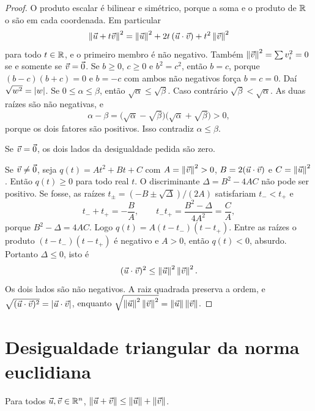 \documentclass[11pt,a4paper]{article}
\begin{document}
\begin{proof}
O produto escalar é bilinear e simétrico, porque a soma e o produto de $\mathbb{R}$ o são em cada coordenada. Em particular
\[
\left\lVert \vec{u}+t\vec{v} \right\rVert^2
=\left\lVert \vec{u} \right\rVert^2+2t\,(\vec{u}\cdot\vec{v})+t^2\left\lVert \vec{v} \right\rVert^2
\]
para todo $t\in\mathbb{R}$, e o primeiro membro é não negativo. Também $\left\lVert \vec{v} \right\rVert^2=\sum v_i^2=0$ se e somente se $\vec{v}=\vec{0}$. Se $b\ge 0$, $c\ge 0$ e $b^2=c^2$, então $b=c$, porque $(b-c)(b+c)=0$ e $b=-c$ com ambos não negativos força $b=c=0$. Daí $\sqrt{w^2}=\left\lvert w \right\rvert$. Se $0\le\alpha\le\beta$, então $\sqrt{\alpha}\le\sqrt{\beta}$. Caso contrário $\sqrt{\beta}<\sqrt{\alpha}$. As duas raízes são não negativas, e
\[
\alpha-\beta
=\bigl(\sqrt{\alpha}-\sqrt{\beta}\bigr)\bigl(\sqrt{\alpha}+\sqrt{\beta}\bigr)>0,
\]
porque os dois fatores são positivos. Isso contradiz $\alpha\le\beta$.

Se $\vec{v}=\vec{0}$, os dois lados da desigualdade pedida são zero.

Se $\vec{v}\neq\vec{0}$, seja $q(t)=At^2+Bt+C$ com $A=\left\lVert \vec{v} \right\rVert^2>0$, $B=2(\vec{u}\cdot\vec{v})$ e $C=\left\lVert \vec{u} \right\rVert^2$. Então $q(t)\ge 0$ para todo real $t$. O discriminante $\Delta=B^2-4AC$ não pode ser positivo. Se fosse, as raízes $t_{\pm}=(-B\pm\sqrt{\Delta})/(2A)$ satisfariam $t_-<t_+$ e
\[
t_-+t_+=-\frac{B}{A},\qquad
t_-t_+=\frac{B^2-\Delta}{4A^2}=\frac{C}{A},
\]
porque $B^2-\Delta=4AC$. Logo $q(t)=A(t-t_-)(t-t_+)$. Entre as raízes o produto $(t-t_-)(t-t_+)$ é negativo e $A>0$, então $q(t)<0$, absurdo. Portanto $\Delta\le 0$, isto é
\[
(\vec{u}\cdot\vec{v})^2\le\left\lVert \vec{u} \right\rVert^2\left\lVert \vec{v} \right\rVert^2.
\]
Os dois lados são não negativos. A raiz quadrada preserva a ordem, e $\sqrt{(\vec{u}\cdot\vec{v})^2}=\left\lvert \vec{u}\cdot\vec{v} \right\rvert$, enquanto $\sqrt{\left\lVert \vec{u} \right\rVert^2\left\lVert \vec{v} \right\rVert^2}=\left\lVert \vec{u} \right\rVert\left\lVert \vec{v} \right\rVert$.
\end{proof}

\section{Desigualdade triangular da norma euclidiana}

\begin{teorema}
Para todos $\vec{u},\vec{v}\in\mathbb{R}^n$, $\left\lVert \vec{u}+\vec{v} \right\rVert\le\left\lVert \vec{u} \right\rVert+\left\lVert \vec{v} \right\rVert$.
\end{teorema}
\end{document}
